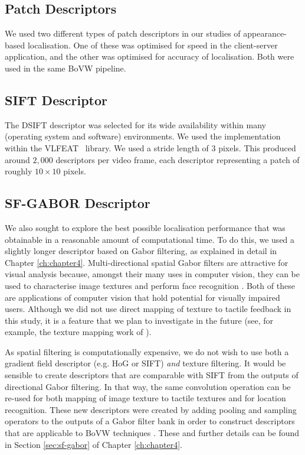 \subsection{Patch Descriptors}

We used two different types of patch descriptors in our studies of appearance-based localisation.  One of these was optimised for speed in the client-server application, and the other was optimised for accuracy of localisation.  Both were used in the same BoVW pipeline.

\subsection{SIFT Descriptor}

The DSIFT descriptor \citep{Lowe1999,LazebnikSP06} was selected for its wide availability within many (operating system and software) environments.  We used the implementation within the VLFEAT~\citep{Vedaldi2008} library. We used a stride length of 3 pixels. This produced around $2,000$ descriptors per video frame, each descriptor representing a patch of roughly $10 \times 10$ pixels.  

\subsection{SF-GABOR Descriptor}

We also sought to explore the best possible localisation performance that was obtainable in a reasonable amount of computational time. To do this, we used a slightly longer descriptor based on Gabor filtering, as explained in detail in Chapter \ref{ch:chapter4}. Multi-directional spatial Gabor filters are attractive for visual analysis because, amongst their many uses in computer vision, they can be used to characterise image textures \citep{jain1990unsupervised,weldon1996efficient,adi2009texture} and perform face recognition \citep{yang2013gabor}. Both of these are applications of computer vision that hold potential for visually impaired users. Although we did not use direct mapping of texture to tactile feedback in this study, it is a feature that we plan to investigate in the future (see, for example, the texture mapping work of \citet{adi2009texture}). 


As spatial filtering is computationally expensive, we do not wish to use both a gradient field descriptor (e.g. HoG or SIFT) {\em and} texture filtering. It would be sensible to create descriptors that are comparable with SIFT from the outputs of directional Gabor filtering. In that way, the same convolution operation can be re-used for both mapping of image texture to tactile textures and for location recognition. These new descriptors were created by adding pooling and sampling operators to the outputs of a Gabor filter bank in order to construct descriptors that are applicable to BoVW techniques \citep{nister2006scalable}. These and further details can be found in Section \ref{sec:sf-gabor} of Chapter \ref{ch:chapter4}.


